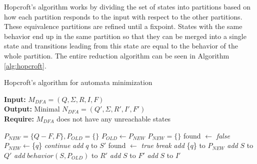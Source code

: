 Hopcroft’s algorithm works by dividing the set of states into partitions based on how each partition responds to the input with respect to the other partitions. These equivalence partitions are refined until a fixpoint. States with the same behavior end up in the same partition so that they can be merged into a single state and transitions leading from this state are equal to the behavior of the whole partition. The entire reduction algorithm can be seen in Algorithm \ref{alg:hopcroft}.

\begin{algorithm}
\caption{Hopcroft's algorithm for automata minimization}\label{alg:hopcroft}
 \hspace*{\algorithmicindent} \textbf{Input: } $M_{DFA}=(Q,\Sigma,R,I,F)$\\
 \hspace*{\algorithmicindent} \textbf{Output:}  Minimal $N_{DFA}=(Q',\Sigma,R',I',F')$ \\
 \hspace*{\algorithmicindent} \textbf{Require:}  $M_{DFA}$ does not have any unreachable states
\begin{algorithmic}[1]
\LState $P_{NEW} = \{Q-F, F\}, P_{OLD} = \{\}$
    \LState $P_{OLD} \gets P_{NEW}$
    \LState $P_{NEW} = \{\}$
            \LState found $\gets$ \textit{false}
                \LState $P_{NEW}\gets$\{$q$\}
                \LState \textit{continue}
            \popindent\EndIf
                    \LState \textit{add} $q$ to $S'$
                    \LState found $\gets$ \textit{true}
                    \LState \textit{break}
                \popindent\EndIf
            \popindent\EndFor
                \LState \textit{add} \{$q$\} to $P_{NEW}$
            \popindent\EndIf
        \popindent\EndFor
    \popindent\EndFor
\popindent\EndWhile
{}
    \LState \textit{add} $S$ to $Q'$
    \LState \textit{add} $behavior(S, P_{OLD})$ to $R'$
        \LState \textit{add} $S$ to $F'$
    \popindent\EndIf
        \LState \textit{add} $S$ to $I'$
    \popindent\EndIf
\EndFor
\Return
\end{algorithmic}
\end{algorithm}

